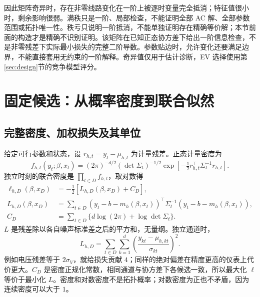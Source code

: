 \documentclass[UTF8,fontset=fandol,11pt,a4paper]{ctexart}
\begin{document}
因此矩阵奇异时，存在非零线路变化在一阶上被逐时变量完全抵消；特征值很小时，剩余影响很弱。满秩只是一阶、局部检查，不能证明全部 AC 解、全部参数范围或拓扑唯一性。秩亏只说明一阶抵消，不能单独证明存在精确等价解；本节前面的构造才是精确不识别证明。该矩阵在已知正态协方差下给出一阶信息检查，不是非零残差下实际最小损失的完整二阶导数。参数贴边时，允许变化还要满足边界，不能直接套用无约束的一阶解释。奇异值仅用于估计诊断，EV 选择使用第\ref{sec:design}节的竞争模型评分。

\section{固定候选：从概率密度到联合似然}
\label{sec:fit}
\subsection{完整密度、加权损失及其单位}
给定可行参数和状态，设 $r_{h,t}=y_t-\mu_{h,t}$ 为计量残差。正态计量密度为
\begin{equation}
 f_{h,t}(y_t;\beta,x_t)=
 (2\pi)^{-d/2}(\det\Sigma_t)^{-1/2}
 \exp\!\left[-\tfrac12r_{h,t}^\top\Sigma_t^{-1}r_{h,t}\right].
 \label{eq:density}
\end{equation}
独立时刻的联合密度是 $\prod_{t\in D}f_{h,t}$，取对数得
\begin{align}
 \ell_{h,D}(\beta,x_D)
   &=-\tfrac12\left[L_{h,D}(\beta,x_D)+C_D\right],\label{eq:likelihood}\\
 L_{h,D}(\beta,x_D)
   &=\sum_{t\in D}(y_t-b-m_h(\beta,x_t))^\top
                    \Sigma_t^{-1}(y_t-b-m_h(\beta,x_t)),\label{eq:loss}\\
 C_D&=\sum_{t\in D}\{d\log(2\pi)+\log\det\Sigma_t\}.\label{eq:normalizer}
\end{align}
$L$ 是残差除以各自噪声标准差之后的平方和，无量纲。独立通道时，
\[
 L_{h,D}=\sum_{t\in D}\sum_{k=1}^{d}
                 \left(\frac{y_{kt}-\mu_{h,kt}}{\sigma_{kt}}\right)^2.
\]
例如电压残差等于 $2\sigma_V$，就给损失贡献 $4$；同样的绝对偏差在精度更高的仪表上代价更大。$C_D$ 是密度正规化常数，相同通道与协方差下各候选一致，所以最大化 $\ell$ 等价于最小化 $L$。密度和对数密度不是拓扑概率；对数密度为正也不矛盾，因为连续密度可以大于 $1$。
\end{document}

